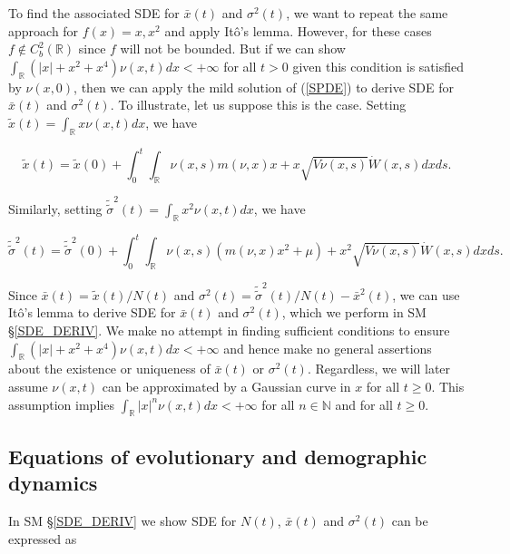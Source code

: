 \documentclass[]{elsarticle} %
\begin{document}
To find the associated SDE for \(\bar x(t)\) and \(\sigma^2(t)\), we
want to repeat the same approach for \(f(x)=x,x^2\) and apply Itô's
lemma. However, for these cases \(f\notin C^2_b(\mathbb{R})\) since
\(f\) will not be bounded. But if we can show
\(\int_\mathbb{R}(|x|+x^2+x^4)\nu(x,t)dx<+\infty\) for all \(t>0\) given
this condition is satisfied by \(\nu(x,0)\), then we can apply the mild
solution of (\ref{SPDE}) to derive SDE for \(\bar x(t)\) and
\(\sigma^2(t)\). To illustrate, let us suppose this is the case. Setting
\(\tilde x(t)=\int_\mathbb{R}x\nu(x,t)dx\), we have

\begin{equation}
\tilde x(t)=\tilde x(0)+\int_0^t\int_\mathbb{R}\nu(x,s)m(\nu,x)x+x\sqrt{V\nu(x,s)}\dot W(x,s)dxds.
\end{equation}

Similarly, setting
\(\tilde{\tilde\sigma}^2(t)=\int_\mathbb{R}x^2\nu(x,t)dx\), we have

\begin{equation}
\tilde{\tilde\sigma}^2(t)=\tilde{\tilde\sigma}^2(0)+\int_0^t\int_\mathbb{R}\nu(x,s)\left(m(\nu,x)x^2+\mu\right)+x^2\sqrt{V\nu(x,s)}\dot W(x,s)dxds.
\end{equation}

Since \(\bar x(t)=\tilde x(t)/N(t)\) and
\(\sigma^2(t)=\tilde{\tilde\sigma}^2(t)/N(t)-\bar x^2(t)\), we can use
Itô's lemma to derive SDE for \(\bar x(t)\) and \(\sigma^2(t)\), which
we perform in SM \S\ref{SDE_DERIV}. We make no attempt in finding
sufficient conditions to ensure
\(\int_\mathbb{R}(|x|+x^2+x^4)\nu(x,t)dx<+\infty\) and hence make no
general assertions about the existence or uniqueness of \(\bar x(t)\) or
\(\sigma^2(t)\). Regardless, we will later assume \(\nu(x,t)\) can be
approximated by a Gaussian curve in \(x\) for all \(t\geq0\). This
assumption implies \(\int_\mathbb{R}|x|^n\nu(x,t)dx<+\infty\) for all
\(n\in\mathbb{N}\) and for all \(t\geq0\).

\hypertarget{equations-of-evolutionary-and-demographic-dynamics}{%
\subsection{\texorpdfstring{Equations of evolutionary and demographic
dynamics
\label{equations}}{Equations of evolutionary and demographic dynamics }}\label{equations-of-evolutionary-and-demographic-dynamics}}

In SM \S\ref{SDE_DERIV} we show SDE for \(N(t)\), \(\bar x(t)\) and
\(\sigma^2(t)\) can be expressed as
\end{document}
